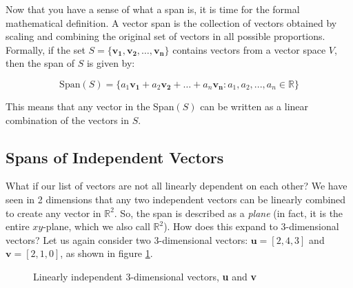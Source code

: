 Now that you have a sense of what a span is, it is time for the formal 
mathematical definition. A vector span is the collection of vectors obtained 
by scaling and combining the original set of vectors in all possible 
proportions. Formally, if the set $S = \{\mathbf{v_1}, \mathbf{v_2}, \dots, 
\mathbf{v_n}\}$ contains vectors from a vector space $V$, then the span of $S$ 
is given by:

\begin{equation}
\text{Span}(S) = \{a_1 \mathbf{v_1} + a_2 \mathbf{v_2} + \dots + a_n 
\mathbf{v_n} : a_1, a_2, ..., a_n \in \mathbb{R}\}
\end{equation}

This means that any vector in the Span$(S)$ can be written as a linear 
combination of the vectors in $S$.

\subsection{Spans of Independent Vectors}
What if our list of vectors are not all linearly dependent on each other? We have 
seen in 2 dimensions that any two independent vectors can be linearly combined 
to create any vector in $\mathbb{R}^2$. So, the span is described as a 
\textit{plane} (in fact, it is the entire $xy$-plane, which we also call 
$\mathbb{R}^2$). How does this expand to 3-dimensional vectors? 
Let us again consider two 3-dimensional vectors: $\mathbf{u} = \left[2, 4, 3 
\right]$ and $\mathbf{v} = \left[ 2, 1, 0 \right]$, as shown in figure 
\ref{fig:3d_ind}.

\begin{figure}[H]
\centering
{}
\caption{Linearly independent 3-dimensional vectors, \textbf{u} and \textbf{v}}
\label{fig:3d_ind}
\end{figure}

